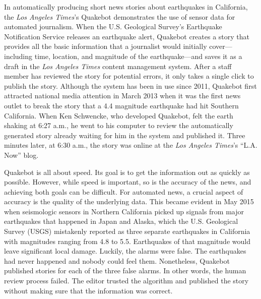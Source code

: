 \documentclass[notoc, symmetric, nobib, nols]{towcenter-guideto-book}
\begin{document}
In automatically producing short news stories about earthquakes in California, the \textit{Los Angeles Times}'s Quakebot demonstrates the use of sensor data for automated journalism. When the U.S. Geological Survey's Earthquake Notification Service releases an earthquake alert, Quakebot creates a story that provides all the basic information that a journalist would initially cover---including time, location, and magnitude of the earthquake---and saves it as a draft in the \textit{Los Angeles Times} content management system. After a staff member has reviewed the story for potential errors, it only takes a single click to publish the story. Although the system has been in use since 2011, Quakebot first attracted national media attention in March 2013 when it was the first news outlet to break the story that a 4.4 magnitude earthquake had hit Southern California. When Ken Schwencke, who developed Quakebot, felt the earth shaking at 6:27 a.m., he went to his computer to review the automatically generated story already waiting for him in the system and published it. Three minutes later, at 6:30 a.m., the story was online at the \textit{Los Angeles Times}'s ``L.A. Now'' blog.\autocite{pluc14}

Quakebot is all about speed. Its goal is to get the information out as quickly as possible. However, while speed is important, so is the accuracy of the news, and achieving both goals can be difficult. For automated news, a crucial aspect of accuracy is the quality of the underlying data. This became evident in May 2015 when seismologic sensors in Northern California picked up signals from major earthquakes that happened in Japan and Alaska, which the U.S. Geological Survey (USGS) mistakenly reported as three separate earthquakes in California with magnitudes ranging from 4.8 to 5.5. Earthquakes of that magnitude would leave significant local damage. Luckily, the alarms were false. The earthquakes had never happened and nobody could feel them. Nonetheless, Quakebot published stories for each of the three false alarms. In other words, the human review process failed. The editor trusted the algorithm and published the story without making sure that the information was correct.\autocite{mercer15}
\end{document}
